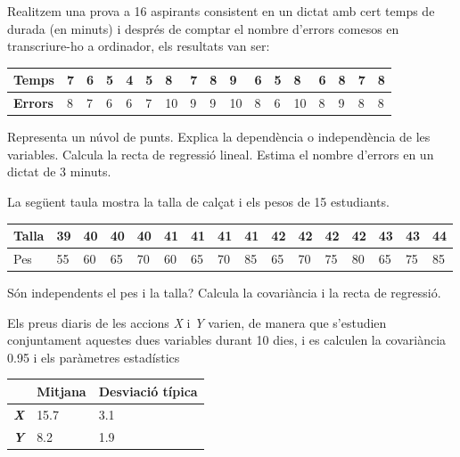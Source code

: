 \begin{autoaval}{40}
 

\begin{mylist}
	\exer[2]  Realitzem una prova a 16 aspirants consistent en un dictat amb cert temps de durada (en minuts) i després de comptar el nombre d'errors comesos en transcriure-ho a ordinador, els resultats van ser: 


\begin{tabular}{|p{0.5in}|p{0.15in}|p{0.15in}|p{0.15in}|p{0.15in}|p{0.15in}|p{0.15in}|p{0.15in}|p{0.15in}|p{0.15in}|p{0.15in}|p{0.15in}|p{0.15in}|p{0.15in}|p{0.15in}|p{0.15in}|p{0.15in}|} \hline 
	\textbf{Temps} & 7 & 6 & 5 & 4 & 5 & 8 & 7 & 8 & 9 & 6 & 5 & 8 & 6 & 8 & 7 & 8  \\ \hline 
	\textbf{Errors} & 8 & 7 & 6 & 6 & 7 & 10 & 9 & 9 & 10 & 8 & 6 & 10 & 8 & 9 & 8 & 8  \\ \hline 
\end{tabular}
\begin{tasks}
	\task Representa un núvol de punts. Explica la dependència o independència de les variables. 
	\task Calcula la recta de regressió lineal. Estima el nombre d'errors en un dictat de 3 minuts. 
\end{tasks}
	

	
\exer[2] La següent taula mostra la talla de calçat i els pesos de 15 estudiants. 

\begin{tabular}{|p{0.38in}|p{0.18in}|p{0.18in}|p{0.18in}|p{0.18in}|p{0.18in}|p{0.18in}|p{0.18in}|p{0.18in}|p{0.18in}|p{0.18in}|p{0.18in}|p{0.18in}|p{0.18in}|p{0.18in}|p{0.2in}|} \hline 
	Talla & 39 & 40 & 40 & 40 & 41 & 41 & 41 & 41 & 42 & 42 & 42 & 42 & 43 & 43 & 44 \\ \hline 
	Pes & 55 & 60 & 65 & 70 & 60 & 65 & 70 & 85 & 65 & 70 & 75 & 80 & 65 & 75 & 85 \\ \hline 
\end{tabular}
 Són independents el pes i la talla? Calcula la covariància i la recta de regressió. 
	 
 	
 
 
\exer[2]  Els preus diaris de les accions \textit{X} i \textit{Y} varien, de manera que s'estudien conjuntament aquestes dues variables durant 10 dies, i es calculen la covariància  0.95 i
	els paràmetres estadístics
\begin{center} 
\begin{tabular}{|p{1.4in}|p{1.1in}|p{1.1in}|} \hline 
	& \textbf{Mitjana} & \textbf{Desviació típica} \\ \hline 
	\textbf{\textit{X}} & 15.7 & 3.1 \\ \hline 
	\textbf{\textit{Y}} & 8.2 & 1.9 \\ \hline 
\end{tabular}
\end{center}


\end{mylist}
\end{autoaval}
